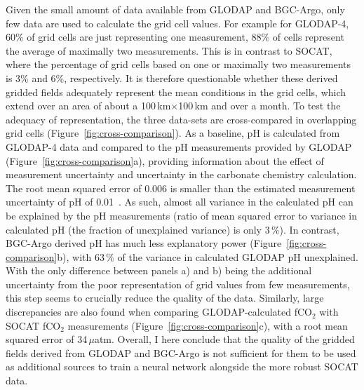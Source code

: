 \documentclass{article}
\begin{document}
	Given the small amount of data available from GLODAP and BGC-Argo, only few data are used to calculate the grid cell values. For example for GLODAP-4, 60\% of grid cells are just representing one measurement, 88\% of cells represent the average of maximally two measurements. This is in contrast to SOCAT, where the percentage of grid cells based on one or maximally two measurements is 3\% and 6\%, respectively. It is therefore questionable whether these derived gridded fields adequately represent the mean conditions in the grid cells, which extend over an area of about a 100\,km$\times$100\,km and over a month. To test the adequacy of representation, the three data-sets are cross-compared in overlapping grid cells (Figure~\ref{fig:cross-comparison}). As a baseline, pH is calculated from GLODAP-4 data and compared to the pH measurements provided by GLODAP (Figure~\ref{fig:cross-comparison}a), providing information about the effect of measurement uncertainty and uncertainty in the carbonate chemistry calculation. The root mean squared error of 0.006 is smaller than the estimated measurement uncertainty of pH of 0.01~\cite{lauvset2024}. As such, almost all variance in the calculated pH can be explained by the pH measurements (ratio of mean squared error to variance in calculated pH (the fraction of unexplained variance) is only 3\,\%). In contrast, BGC-Argo derived pH has much less explanatory power (Figure~\ref{fig:cross-comparison}b), with 63\,\% of the variance in calculated GLODAP pH unexplained. With the only difference between panels a) and b) being the additional uncertainty from the poor representation of grid values from few measurements, this step seems to crucially reduce the quality of the data. Similarly, large discrepancies are also found when comparing GLODAP-calculated fCO$_2$ with SOCAT fCO$_2$ measurements (Figure~\ref{fig:cross-comparison}c), with a root mean squared error of 34\,$\mu$atm. Overall, I here conclude that the quality of the gridded fields derived from GLODAP and BGC-Argo is not sufficient for them to be used as additional sources to train a neural network alongside the more robust SOCAT data.
	
\end{document}
